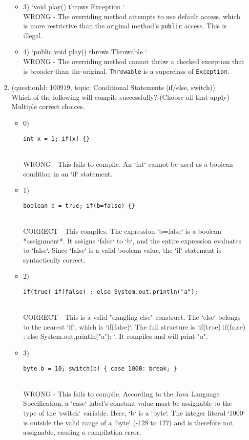\documentclass[12pt]{article}
\begin{document}
\begin{enumerate}[label=(\arabic*)]
\begin{itemize}
\item 3) `void play() throws Exception {}`
 \\ 
WRONG - The overriding method attempts to use default access, which is more restrictive than the original method's \verb|public| access. This is illegal.

\item 4) `public void play() throws Throwable {}`
 \\ 
WRONG - The overriding method cannot throw a checked exception that is broader than the original. \verb|Throwable| is a superclass of \verb|Exception|.

\end{itemize}
\item (questionId: 100919, topic: Conditional Statements (if/else, switch)) \\ 
Which of the following will compile successfully? (Choose all that apply)
\\ \noindent Multiple correct choices. 
\begin{itemize}
\item 0) \begin{verbatim}int x = 1; if(x) {}
\end{verbatim}
 \\ 
WRONG - This fails to compile. An `int` cannot be used as a boolean condition in an `if` statement.

\item 1) \begin{verbatim}boolean b = true; if(b=false) {}
\end{verbatim}
 \\ 
CORRECT - This compiles. The expression `b=false` is a boolean *assignment*. It assigns `false` to `b`, and the entire expression evaluates to `false`. Since `false` is a valid boolean value, the `if` statement is syntactically correct.

\item 2) \begin{verbatim}if(true) if(false) ; else System.out.println("a");
\end{verbatim}
 \\ 
CORRECT - This is a valid "dangling else" construct. The `else` belongs to the nearest `if`, which is `if(false)`. The full structure is `if(true) { if(false) { ; } else { System.out.println("a"); } }`. It compiles and will print "a".

\item 3) \begin{verbatim}byte b = 10; switch(b) { case 1000: break; }
\end{verbatim}
 \\ 
WRONG - This fails to compile. According to the Java Language Specification, a `case` label's constant value must be assignable to the type of the `switch` variable. Here, `b` is a `byte`. The integer literal `1000` is outside the valid range of a `byte` (-128 to 127) and is therefore not assignable, causing a compilation error.


\end{itemize}
\end{enumerate}
\end{document}
